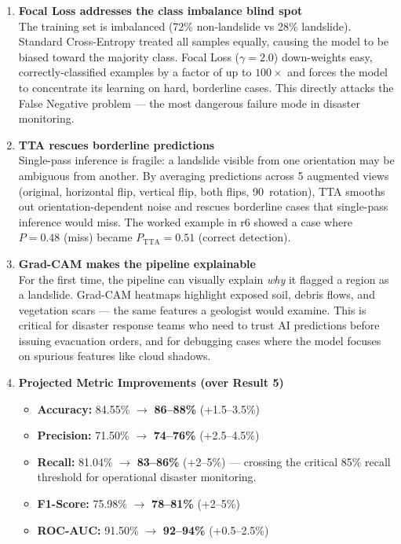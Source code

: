 \documentclass[11pt]{article}
\begin{document}
\begin{enumerate}
    \item \textbf{Focal Loss addresses the class imbalance blind spot}\\
          The training set is imbalanced (72\% non-landslide vs 28\% landslide). Standard Cross-Entropy treated all samples equally, causing the model to be biased toward the majority class. Focal Loss ($\gamma = 2.0$) down-weights easy, correctly-classified examples by a factor of up to $100\times$ and forces the model to concentrate its learning on hard, borderline cases. This directly attacks the False Negative problem --- the most dangerous failure mode in disaster monitoring.

    \item \textbf{TTA rescues borderline predictions}\\
          Single-pass inference is fragile: a landslide visible from one orientation may be ambiguous from another. By averaging predictions across 5 augmented views (original, horizontal flip, vertical flip, both flips, 90\textdegree\ rotation), TTA smooths out orientation-dependent noise and rescues borderline cases that single-pass inference would miss. The worked example in r6 showed a case where $P = 0.48$ (miss) became $P_{\text{TTA}} = 0.51$ (correct detection).

    \item \textbf{Grad-CAM makes the pipeline explainable}\\
          For the first time, the pipeline can visually explain \textit{why} it flagged a region as a landslide. Grad-CAM heatmaps highlight exposed soil, debris flows, and vegetation scars --- the same features a geologist would examine. This is critical for disaster response teams who need to trust AI predictions before issuing evacuation orders, and for debugging cases where the model focuses on spurious features like cloud shadows.

    \item \textbf{Projected Metric Improvements (over Result 5)}
          \begin{itemize}
              \item \textbf{Accuracy:} 84.55\% $\to$ \textbf{86--88\%} (+1.5--3.5\%)
              \item \textbf{Precision:} 71.50\% $\to$ \textbf{74--76\%} (+2.5--4.5\%)
              \item \textbf{Recall:} 81.04\% $\to$ \textbf{83--86\%} (+2--5\%) --- crossing the critical 85\% recall threshold for operational disaster monitoring.
              \item \textbf{F1-Score:} 75.98\% $\to$ \textbf{78--81\%} (+2--5\%)
              \item \textbf{ROC-AUC:} 91.50\% $\to$ \textbf{92--94\%} (+0.5--2.5\%)
          \end{itemize}


\end{enumerate}
\end{document}
